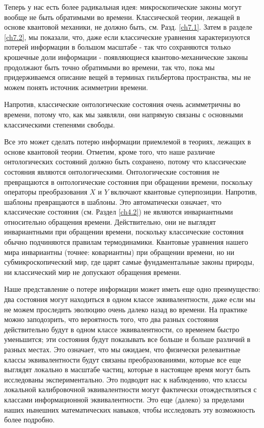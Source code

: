 \documentclass[main.tex]{subfiles}
\begin{document}
Теперь у нас есть более радикальная идея: микроскопические законы могут вообще не быть обратимыми во времени. Классической теории, лежащей в основе квантовой механики, не должно быть, см. Разд. \ref{ch7.1}. Затем в разделе \ref{ch7.2}, мы показали, что, даже если классические уравнения характеризуются потерей информации в большом масштабе - так что сохраняются только крошечные доли информации - появляющиеся квантово-механические законы продолжают быть точно обратимыми во времени, так что, пока мы придерживаемся описание вещей в терминах гильбертова пространства, мы не можем понять источник асимметрии времени.

Напротив, классические онтологические состояния очень асимметричны во времени, потому что, как мы заявляли, они напрямую связаны с основными классическими степенями свободы.

Все это может сделать потерю информации приемлемой в теориях, лежащих в основе квантовой теории. Отметим, кроме того, что наше различие онтологических состояний должно быть сохранено, потому что классические состояния являются онтологическими. Онтологические состояния не превращаются в онтологические состояния при обращении времени, поскольку операторы преобразования $X$ и $Y$ включают квантовые суперпозиции. Напротив, шаблоны превращаются в шаблоны. Это автоматически означает, что классические состояния (см. Раздел \ref{ch4.2}) не являются инвариантными относительно обращения времени. Действительно, они не выглядят инвариантными при обращении времени, поскольку классические состояния обычно подчиняются правилам термодинамики.
Квантовые уравнения нашего мира инвариантны (точнее: ковариантны) при обращении времени, но ни субмикроскопический мир, где царят самые фундаментальные законы природы, ни классический мир не допускают обращения времени.

Наше представление о потере информации может иметь еще одно преимущество: два состояния могут находиться в одном классе эквивалентности, даже если мы не можем проследить эволюцию очень далеко назад во времени. На практике можно заподозрить, что вероятность того, что два разных состояния действительно будут в одном классе эквивалентности, со временем быстро уменьшится; эти состояния будут показывать все больше и больше различий в разных местах. Это означает, что мы ожидаем, что физически релевантные классы эквивалентности будут связаны преобразованиями, которые все еще выглядят локально в масштабе частиц, которые в настоящее время могут быть исследованы экспериментально. Это подводит нас к наблюдению, что классы локальной калибровочной эквивалентности могут фактически отождествляться с классами информационной эквивалентности. Это еще (далеко) за пределами наших нынешних математических навыков, чтобы исследовать эту возможность более подробно.
\end{document}
